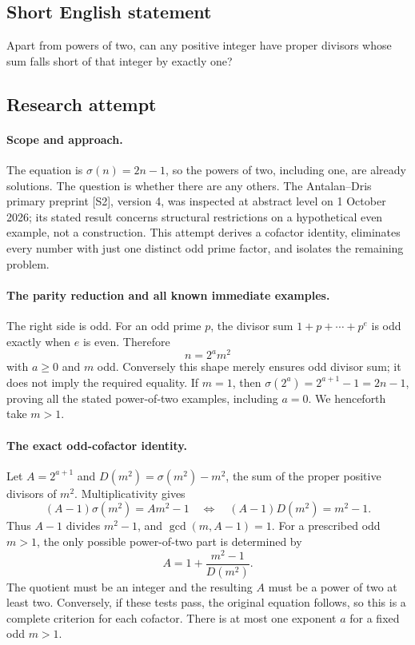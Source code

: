 \documentclass[11pt,a4paper]{article}
\begin{document}
\subsection{Short English statement}

Apart from powers of two, can any positive integer have proper divisors whose sum falls short of that integer by exactly one?

\subsection{Research attempt}

\paragraph{Scope and approach.}
The equation is $\sigma(n)=2n-1$, so the powers of two, including one,
are already solutions. The question is whether there are any others.
The Antalan--Dris primary preprint [S2], version 4, was inspected at
abstract level on 1 October 2026; its stated result concerns structural
restrictions on a hypothetical even example, not a construction.
This attempt derives a cofactor identity, eliminates every number with
just one distinct odd prime factor, and isolates the remaining problem.

\paragraph{The parity reduction and all known immediate examples.}
The right side is odd. For an odd prime $p$, the divisor sum
$1+p+\cdots+p^e$ is odd exactly when $e$ is even. Therefore
\[
                          n=2^a m^2
\]
with $a\ge0$ and $m$ odd. Conversely this shape merely ensures odd
divisor sum; it does not imply the required equality. If $m=1$, then
$\sigma(2^a)=2^{a+1}-1=2n-1$, proving all the stated power-of-two
examples, including $a=0$. We henceforth take $m>1$.

\paragraph{The exact odd-cofactor identity.}
Let $A=2^{a+1}$ and $D(m^2)=\sigma(m^2)-m^2$, the sum of the
proper positive divisors of $m^2$. Multiplicativity gives
\[
 (A-1)\sigma(m^2)=Am^2-1
 \quad\Longleftrightarrow\quad
                       (A-1)D(m^2)=m^2-1.
\]
Thus $A-1$ divides $m^2-1$, and $\gcd(m,A-1)=1$.
For a prescribed odd $m>1$, the only possible power-of-two part is
determined by
\[
             A=1+\frac{m^2-1}{D(m^2)}.
\]
The quotient must be an integer and the resulting $A$ must be a power
of two at least two. Conversely, if these tests pass, the original
equation follows, so this is a complete criterion for each cofactor.
There is at most one exponent $a$ for a fixed odd $m>1$.
\end{document}
